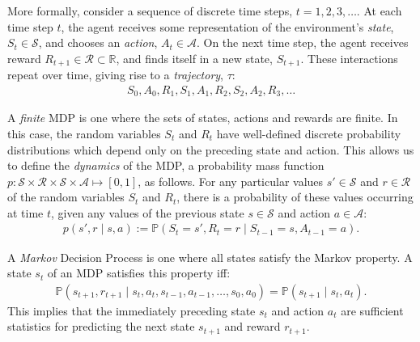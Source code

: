 \documentclass[11pt, a4paper, bibliography=totoc]{report}
\newcommand{\reals}{\mathbb{R}}
\renewcommand{\P}[1]{\mathbb{P}\left( #1 \right) }
\begin{document}
More formally, consider a sequence of discrete time steps, $t = 1,2,3, \dots$. At each time step $t$, the agent receives some representation of the environment's \textit{state}, $ S_t \in \mathcal{S} $, and chooses an \textit{action}, $ A_t \in \mathcal{A} $. On the next time step, the agent receives reward $ R_{t+1} \in \mathcal{R} \subset \reals $, and finds itself in a new state, $ S_{t+1} $. These interactions repeat over time, giving rise to a \textit{trajectory}, $ \tau $:
\begin{align*}
S_0, A_0, R_1, S_1, A_1, R_2, S_2, A_2, R_3, \dots
\end{align*}

A \textit{finite} MDP is one where the sets of states, actions and rewards are finite. In this case, the random variables $ S_t $ and $ R_t $ have well-defined discrete probability distributions which depend only on the preceding state and action. This allows us to define the \textit{dynamics} of the MDP, a probability mass function $ p : \mathcal{S} \times \mathcal{R} \times \mathcal{S} \times \mathcal{A} \mapsto [0,1] $, as follows. For any particular values $ s' \in \mathcal{S} $ and $ r \in \mathcal{R} $ of the random variables $ S_t $ and $ R_t $, there is a probability of these values occurring at time $ t $, given any values of the previous state $ s \in \mathcal{S} $ and action $ a \in \mathcal{A} $:
\begin{align*}
p(s', r \mid s, a) := \P{S_t = s', R_t = r \mid S_{t-1} = s , A_{t-1} = a }.
\end{align*}

A \textit{Markov} Decision Process is one where all states satisfy the Markov property. A state $ s_t $ of an MDP satisfies this property iff:
\begin{align*}
\P{s_{t+1}, r_{t+1} \mid s_t, a_t, s_{t-1}, a_{t-1}, \dots, s_0, a_0 } = \P{s_{t+1} \mid s_t, a_t}.
\end{align*}
This implies that the immediately preceding state $ s_t $ and action $ a_t $ are sufficient statistics for predicting the next state $ s_{t+1} $ and reward $ r_{t+1} $.
\end{document}
